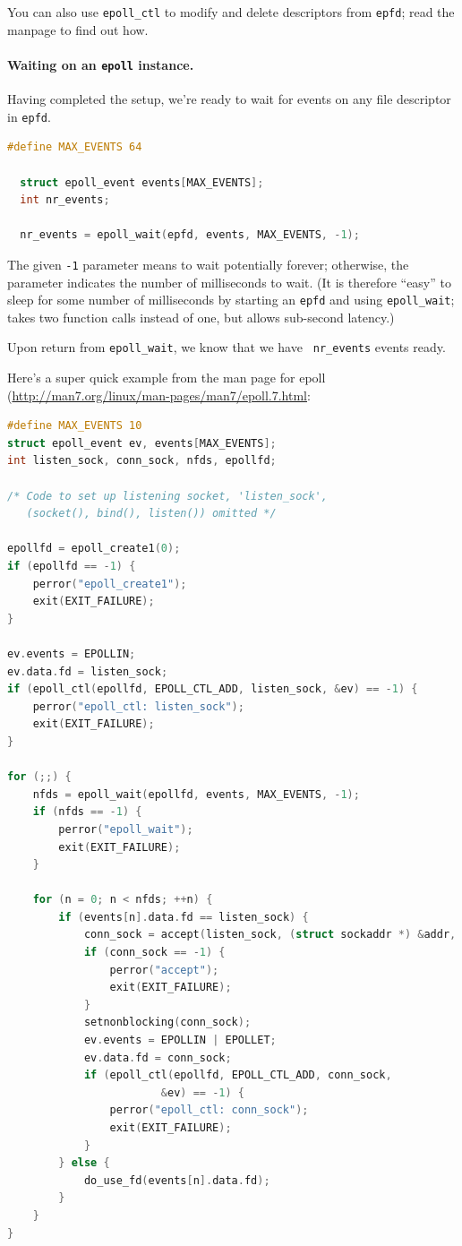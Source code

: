 \documentclass[a4paper]{report}
\begin{document}
You can also use {\tt epoll\_ctl} to modify and delete descriptors from {\tt epfd}; read the manpage to find out how.

\paragraph{Waiting on an {\tt epoll} instance.} Having completed
the setup, we're ready to wait for events on any file descriptor in {\tt epfd}.
    \begin{lstlisting}[language=C]
  #define MAX_EVENTS 64

  struct epoll_event events[MAX_EVENTS];
  int nr_events;

  nr_events = epoll_wait(epfd, events, MAX_EVENTS, -1);
    \end{lstlisting}

The given {\tt -1} parameter means to wait potentially forever;
otherwise, the parameter indicates the number of milliseconds to wait.
(It is therefore ``easy'' to sleep for some number of milliseconds by
starting an {\tt epfd} and using {\tt epoll\_wait}; takes two function
calls instead of one, but allows sub-second latency.)

Upon return from {\tt epoll\_wait}, we know that we have {\tt
  nr\_events} events ready.


Here's a super quick example from the man page for epoll (\url{http://man7.org/linux/man-pages/man7/epoll.7.html}:

\begin{lstlisting}[language=C]
#define MAX_EVENTS 10
struct epoll_event ev, events[MAX_EVENTS];
int listen_sock, conn_sock, nfds, epollfd;

/* Code to set up listening socket, 'listen_sock',
   (socket(), bind(), listen()) omitted */

epollfd = epoll_create1(0);
if (epollfd == -1) {
    perror("epoll_create1");
    exit(EXIT_FAILURE);
}

ev.events = EPOLLIN;
ev.data.fd = listen_sock;
if (epoll_ctl(epollfd, EPOLL_CTL_ADD, listen_sock, &ev) == -1) {
    perror("epoll_ctl: listen_sock");
    exit(EXIT_FAILURE);
}

for (;;) {
    nfds = epoll_wait(epollfd, events, MAX_EVENTS, -1);
    if (nfds == -1) {
        perror("epoll_wait");
        exit(EXIT_FAILURE);
    }

    for (n = 0; n < nfds; ++n) {
        if (events[n].data.fd == listen_sock) {
            conn_sock = accept(listen_sock, (struct sockaddr *) &addr, &addrlen);
            if (conn_sock == -1) {
                perror("accept");
                exit(EXIT_FAILURE);
            }
            setnonblocking(conn_sock);
            ev.events = EPOLLIN | EPOLLET;
            ev.data.fd = conn_sock;
            if (epoll_ctl(epollfd, EPOLL_CTL_ADD, conn_sock,
                        &ev) == -1) {
                perror("epoll_ctl: conn_sock");
                exit(EXIT_FAILURE);
            }
        } else {
            do_use_fd(events[n].data.fd);
        }
    }
}
\end{lstlisting}
\end{document}
